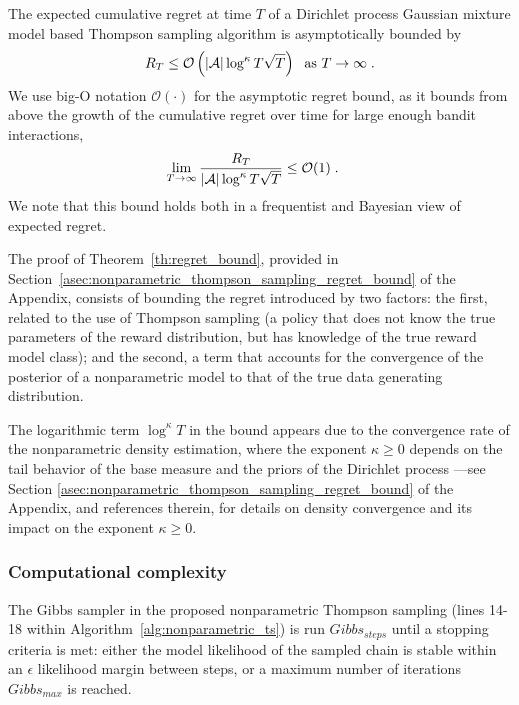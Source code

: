 \begin{theorem}
	The expected cumulative regret at time $T$ of a Dirichlet process Gaussian mixture model based Thompson sampling algorithm is asymptotically bounded by
	\begin{equation}
	R_T	\leq \mathcal{O}\left(|\mathcal{A}| \log^\kappa T \sqrt{T} \right) \; \text{ as } T \rightarrow \infty \; .
	\nonumber
	\end{equation}
	We use big-O notation $\mathcal{O}(\cdot)$ for the asymptotic regret bound, as it bounds from above the growth of the cumulative regret over time for large enough bandit interactions, \ie
	\begin{align}
	\lim_{T\rightarrow \infty} \frac{R_T}{|\mathcal{A}| \log^\kappa T \sqrt{T} } & \leq \mathcal{O}(1)\; .
	\end{align}
	We note that this bound holds both in a frequentist and Bayesian view of expected regret.
	\label{th:regret_bound}
\end{theorem}

The proof of Theorem~\ref{th:regret_bound}, provided in Section~\ref{asec:nonparametric_thompson_sampling_regret_bound} of the Appendix, consists of bounding the regret introduced by two factors: the first, related to the use of Thompson sampling (\ie a policy that does not know the true parameters of the reward distribution, but has knowledge of the true reward model class); and the second, a term that accounts for the convergence of the posterior of a nonparametric model to that of the true data generating distribution.

The logarithmic term $\log^\kappa T$ in the bound appears due to the convergence rate of the nonparametric density estimation, where the exponent $\kappa\geq 0$ depends on the tail behavior of the base measure and the priors of the Dirichlet process ---see Section \ref{asec:nonparametric_thompson_sampling_regret_bound} of the Appendix, and references therein, for details on density convergence and its impact on the exponent $\kappa\geq 0$.

\subsubsection{Computational complexity}
\label{sssec:nonparametric_thompson_sampling_computational_complexity}
The Gibbs sampler in the proposed nonparametric Thompson sampling (lines 14-18 within Algorithm~\ref{alg:nonparametric_ts}) is run $Gibbs_{steps}$ until a stopping criteria is met: either the model likelihood of the sampled chain is stable within an $\epsilon$ likelihood margin between steps, or a maximum number of iterations $Gibbs_{max}$ is reached.

